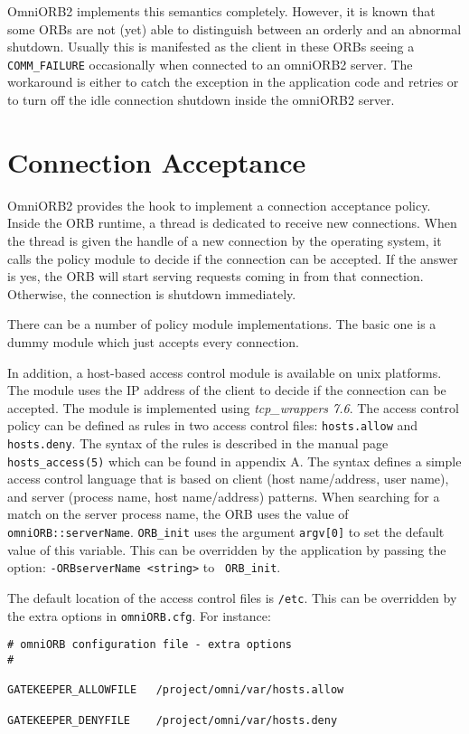 \documentclass[11pt,twoside,onecolumn]{book}
\begin{document}
OmniORB2 implements this semantics completely. However, it is known that
some ORBs are not (yet) able to distinguish between an orderly and an
abnormal shutdown. Usually this is manifested as the client in these ORBs
seeing a {\tt COMM\_FAILURE} occasionally when connected to an omniORB2
server. The workaround is either to catch the exception in the application
code and retries or to turn off the idle connection shutdown inside the
omniORB2 server.


\section{Connection Acceptance}
\label{sec_accept}

OmniORB2 provides the hook to implement a connection acceptance
policy. Inside the ORB runtime, a thread is dedicated to receive new
connections. When the thread is given the handle of a new connection by
the operating system, it calls the policy module to decide if the
connection can be accepted. If the answer is yes, the ORB will start
serving requests coming in from that connection. Otherwise, the connection
is shutdown immediately.

There can be a number of policy module implementations. The basic one is a
dummy module which just accepts every connection. 

In addition, a host-based access control module is available on unix
platforms. The module uses the IP address of the client to decide if the
connection can be accepted. The module is implemented using {\em
tcp\_wrappers 7.6}. The access control policy can be defined as rules in
two access control files: {\tt hosts.allow} and {\tt hosts.deny}. The
syntax of the rules is described in the manual page {\tt hosts\_access(5)}
which can be found in appendix A. The syntax defines a simple access
control language that is based on client (host name/address, user name),
and server (process name, host name/address) patterns. When searching for a
match on the server process name, the ORB uses the value of {\tt
omniORB::serverName}. {\tt ORB\_init} uses the argument {\tt argv[0]} to
set the default value of this variable. This can be overridden by the
application by passing the option: {\tt -ORBserverName <string>} to {\tt
ORB\_init}.

The default location of the access control files is {\tt /etc}. This can be
overridden by the extra options in {\tt omniORB.cfg}. For instance:

{\small
\begin{verbatim}
# omniORB configuration file - extra options
#

GATEKEEPER_ALLOWFILE   /project/omni/var/hosts.allow

GATEKEEPER_DENYFILE    /project/omni/var/hosts.deny

\end{verbatim}
}
\end{document}
